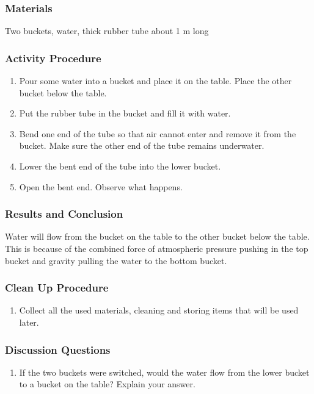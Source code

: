 \subsubsection*{Materials}
Two buckets, water, thick rubber tube about 1 m long

\subsubsection*{Activity Procedure}
\begin{enumerate}
\item{Pour some water into a bucket and place it on the table. Place the other bucket below the table.} 
\item{Put the rubber tube in the bucket and fill it with water.} 
\item{Bend one end of the tube so that air cannot enter and remove it from the bucket. Make sure the other end of the tube remains underwater.}
\item{Lower the bent end of the tube into the lower bucket.}
\item{Open the bent end. Observe what happens.} 
\end{enumerate}

\subsubsection*{Results and Conclusion}
Water will flow from the bucket on the table to the other bucket below the table. This is because of the combined force of atmospheric pressure pushing in the top bucket and gravity pulling the water to the bottom bucket.

\subsubsection*{Clean Up Procedure}
\begin{enumerate}
\item{Collect all the used materials, cleaning and storing items that will be used later.} 
\end{enumerate}

\subsubsection*{Discussion Questions}
\begin{enumerate}
\item{If the two buckets were switched, would the water flow from the lower bucket to a bucket on the table? Explain your answer.}
\end{enumerate}


